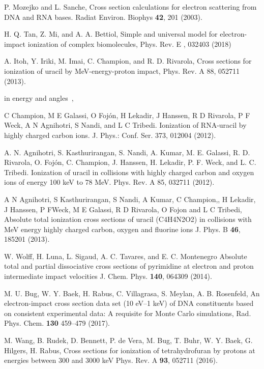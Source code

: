 \documentclass[preprint,12pt]{article}
\begin{document}
\begin{thebibliography}{99}
P. Mozejko and L. Sanche, 
Cross section calculations for electron scattering from DNA and RNA bases.
Radiat Environ. Biophys \textbf{42}, 201 (2003).

H. Q. Tan, Z. Mi, and A. A. Bettiol, 
Simple and universal model for electron-impact ionization of complex biomolecules, 
Phys. Rev. E , 032403 (2018)

A. Itoh, Y. Iriki, M. Imai, C. Champion, and R. D. Rivarola, 
Cross sections for ionization of uracil by MeV-energy-proton impact, 
Phys. Rev. A 88, 052711 (2013).

\bibitem{} in energy and angles~,

C Champion, M E Galassi, O Foj\'{o}n, H Lekadir, J Hanssen, R D Rivarola,
P F Weck, A N Agnihotri, S Nandi, and L C Tribedi. Ionization of RNA-uracil
by highly charged carbon ions.
J. Phys.: Conf. Ser. 373, 012004 (2012).

A. N. Agnihotri, S. Kasthurirangan, S. Nandi, A.
Kumar, M. E. Galassi, R. D. Rivarola, O. Foj\'{o}n, C. Champion, J. Hanssen,
H. Lekadir, P. F. Weck, and L. C. Tribedi. Ionization of uracil in
collisions with highly charged carbon and oxygen ions of energy 100 keV to
78 MeV. 
Phys. Rev. A 85, 032711 (2012).

A N Agnihotri, S Kasthurirangan, S Nandi, A Kumar, C Champion,, H Lekadir, 
J Hanssen, P FWeck, M E Galassi, R D Rivarola, O Fojon and L C Tribedi, 
Absolute total ionization cross sections of uracil (C4H4N2O2) in 
collisions with MeV energy highly charged carbon, oxygen and fluorine ions
J. Phys. B \textbf{46}, 185201 (2013).

W. Wolff, H. Luna, L. Sigaud, A. C. Tavares, and E. C. Montenegro
Absolute total and partial dissociative cross sections of pyrimidine
at electron and proton intermediate impact velocities
J. Chem. Phys. \textbf{140}, 064309 (2014).

M. U. Bug, W. Y. Baek, H. Rabus, C. Villagrasa, S. Meylan, A. B. Rosenfeld,
An electron-impact cross section data set (10 eV--1 keV) of DNA
constituents based on consistent experimental data: A requisite for 
Monte Carlo simulations,
Rad. Phys. Chem. \textbf{130} 459--479 (2017).

M. Wang, B. Rudek, D. Bennett, P. de Vera, M. Bug, T. Buhr, W. Y. Baek, 
G. Hilgers, H. Rabus, 
Cross sections for ionization of tetrahydrofuran by protons at energies 
between 300 and 3000 keV
Phys. Rev. A \textbf{93}, 052711 (2016).


\end{thebibliography}
\end{document}
